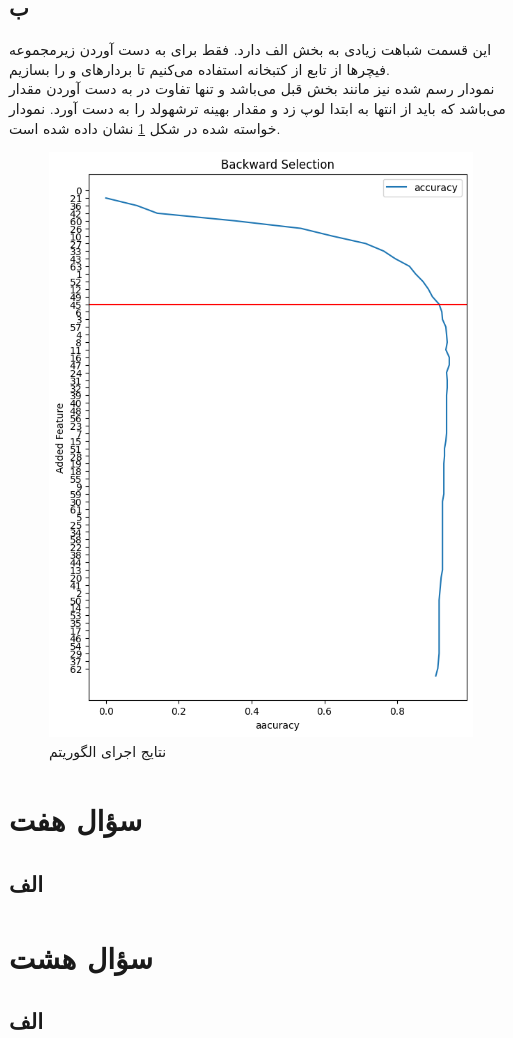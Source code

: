 \documentclass[12pt,onecolumn,a4paper]{article}
\begin{document}
\subsection*{ب}
این قسمت شباهت زیادی به بخش الف دارد. فقط برای به دست آوردن زیرمجموعه فیچرها از تابع  از کتبخانه  استفاده می‌کنیم تا بردارهای  و  را بسازیم. 
\\
نمودار رسم شده نیز مانند بخش قبل می‌باشد و تنها تفاوت در به دست آوردن مقدار  می‌باشد که باید از انتها به ابتدا لوپ زد و مقدار بهینه ترشهولد را به دست آورد. نمودار خواسته شده در شکل \ref{fig:2} نشان داده شده است.
\begin{figure}[h!]
    \begin{center}
    \includegraphics[scale=0.55]{plots/q6_b.png}
    \caption{نتایج اجرای الگوریتم }
    \label{fig:2}
    \end{center}
\end{figure}

\newpage
\section*{سؤال هفت}
\subsection*{الف}


\newpage
\section*{سؤال هشت}
\subsection*{الف}
\end{document}
